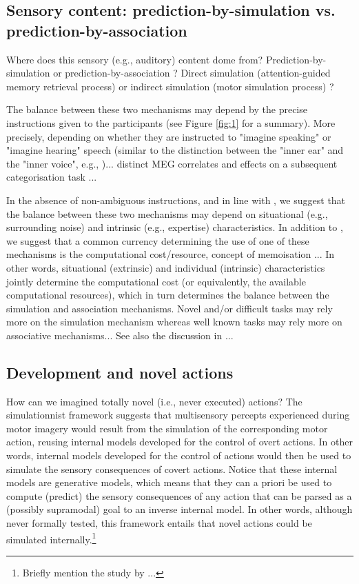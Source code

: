 \documentclass[utf8]{template/frontiersSCNS} %
\begin{document}
\subsection{Sensory content: prediction-by-simulation vs. prediction-by-association}

Where does this sensory (e.g., auditory) content dome from? Prediction-by-simulation or prediction-by-association \citep{pickering_integrated_2013}? Direct simulation (attention-guided memory retrieval process) or indirect simulation (motor simulation process) \citep{tian_mental_2012, tian_effect_2013, li_corollary_2020, ma_distinct_2019}?

The balance between these two mechanisms may depend by the precise instructions given to the participants (see Figure \ref{fig:1} for a summary). More precisely, depending on whether they are instructed to "imagine speaking" or "imagine hearing" speech (similar to the distinction between the "inner ear" and the "inner voice", e.g., \cite{smith_subvocalization_1992})... distinct MEG correlates and effects on a subsequent categorisation task \citep{ma_distinct_2019}...

In the absence of non-ambiguous instructions, and in line with \cite{tian_mental_2012}, we suggest that the balance between these two mechanisms may depend on situational (e.g., surrounding noise) and intrinsic (e.g., expertise) characteristics. In addition to \cite{tian_mental_2012}, we suggest that a common currency determining the use of one of these mechanisms is the computational cost/resource, concept of memoisation \citep{dasgupta_memory_2021}... In other words, situational (extrinsic) and individual (intrinsic) characteristics jointly determine the computational cost (or equivalently, the available computational resources), which in turn determines the balance between the simulation and association mechanisms. Novel and/or difficult tasks may rely more on the simulation mechanism whereas well known tasks may rely more on associative mechanisms... See also the discussion in  \citep{nalborczyk_understanding_2019-1, nalborczyk_re-analysing_2020}...

\subsection{Development and novel actions}

How can we imagined totally novel (i.e., never executed) actions? The simulationnist framework suggests that multisensory percepts experienced during motor imagery would result from the simulation of the corresponding motor action, reusing internal models developed for the control of overt actions. In other words, internal models developed for the control of actions would then be used to simulate the sensory consequences of covert actions. Notice that these internal models are generative models, which means that they can a priori be used to compute (predict) the sensory consequences of any action that can be parsed as a (possibly supramodal) goal to an inverse internal model. In other words, although never formally tested, this framework entails that novel actions could be simulated internally.\footnote{Briefly mention the study by \cite{mulder_role_2004}...}
\end{document}
